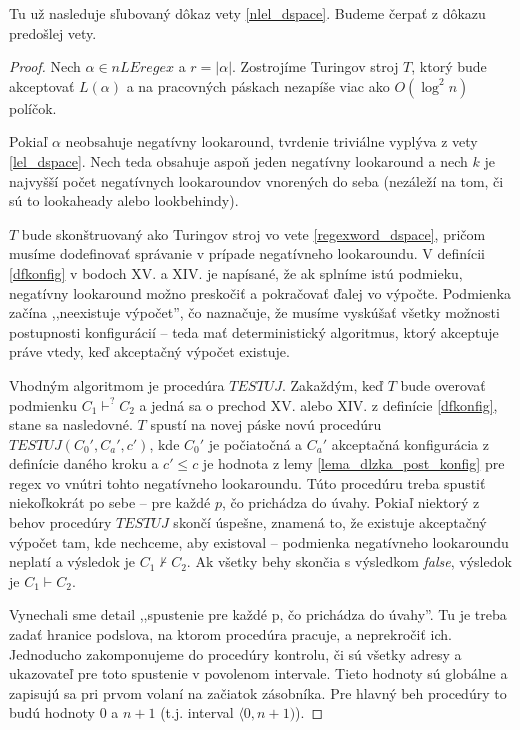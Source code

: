 \documentclass{svk_long_sk}
\def\nle{nLEregex}
\begin{document}
Tu už nasleduje sľubovaný dôkaz vety \ref{nlel_dspace}. Budeme čerpať z dôkazu predošlej vety.
\begin{proof}
Nech $\alpha\in\nle$ a $r=|\alpha|$. Zostrojíme Turingov stroj $T$, ktorý bude akceptovať $L(\alpha)$ a na pracovných páskach nezapíše viac ako $O(\log^2 n)$ políčok.

Pokiaľ $\alpha$ neobsahuje negatívny lookaround, tvrdenie triviálne vyplýva z vety \ref{lel_dspace}. Nech teda obsahuje aspoň jeden negatívny lookaround a nech $k$ je najvyšší počet negatívnych lookaroundov vnorených do seba (nezáleží na tom, či sú to lookaheady alebo look\-behindy).

$T$ bude skonštruovaný ako Turingov stroj vo vete \ref{regexword_dspace}, pričom musíme dodefinovať správanie v prípade negatívneho lookaroundu. V definícii \ref{dfkonfig} v bodoch XV. a XIV. je napísané, že ak splníme istú podmieku, negatívny lookaround možno preskočiť a pokračovať ďalej vo výpočte. Podmienka začína ,,neexistuje výpočet'', čo naznačuje, že musíme vyskúšať všetky možnosti postupnosti konfigurácií -- teda mať deterministický algoritmus, ktorý akceptuje práve vtedy, keď akceptačný výpočet existuje.

Vhodným algoritmom je procedúra $TESTUJ$. Zakaždým, keď $T$ bude overovať podmienku $C_1\mathop{\vdash}^? C_2$ a jedná sa o prechod XV. alebo XIV. z definície \ref{dfkonfig}, stane sa nasledovné. $T$ spustí na novej páske novú procedúru $TESTUJ(C_0',C_a',c')$, kde $C_0'$ je počiatočná a $C_a'$ akceptačná konfigurácia z definície daného kroku a $c' \leq c$ je hodnota z lemy \ref{lema_dlzka_post_konfig} pre regex vo vnútri tohto negatívneho lookaroundu. Túto procedúru treba spustiť niekoľkokrát po sebe -- pre každé $p$, čo prichádza do úvahy. Pokiaľ niektorý z behov procedúry $TESTUJ$ skončí úspešne, znamená to, že existuje akceptačný výpočet tam, kde nechceme, aby existoval -- podmienka negatívneho lookaroundu neplatí a výsledok je $C_1\nvdash C_2$. Ak všetky behy skončia s výsledkom \textit{false}, výsledok je $C_1\vdash C_2$.

Vynechali sme detail ,,spustenie pre každé p, čo prichádza do úvahy''. Tu je treba zadať hranice podslova, na ktorom procedúra pracuje, a neprekročiť ich. Jednoducho zakomponujeme do procedúry kontrolu, či sú všetky adresy a ukazovateľ pre toto spustenie v povolenom intervale. Tieto hodnoty sú globálne a zapisujú sa pri prvom volaní na začiatok zásobníka. Pre hlavný beh procedúry to budú hodnoty 0 a $n+1$ (t.j. interval $\langle 0,n+1)$).


\end{proof}
\end{document}
